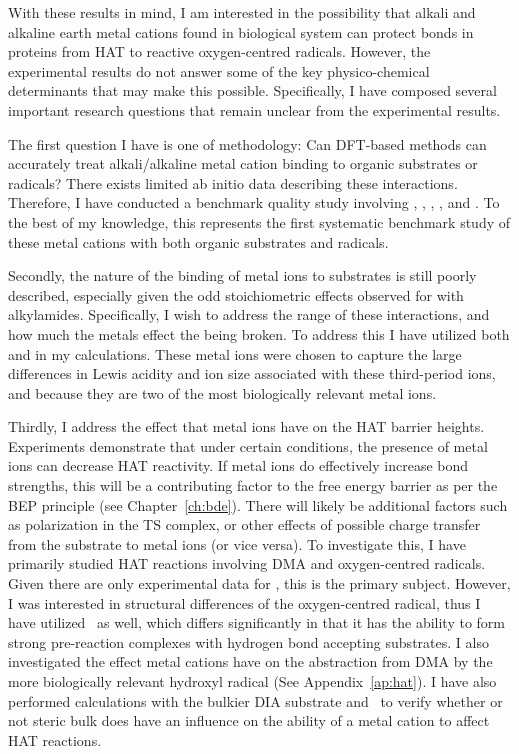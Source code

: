 \begin{doublespace}
With these results in mind, I am interested in the possibility that alkali and
alkaline earth metal cations found in biological system can protect 
bonds in proteins from HAT to reactive oxygen-centred radicals. However, the
experimental results do not answer some of the key physico-chemical determinants
that may make this possible. Specifically, I have composed several important
research questions that remain unclear from the experimental results.

The first question I have is one of methodology: Can DFT-based methods can
accurately treat alkali/alkaline metal cation binding to organic substrates or
radicals? There exists limited ab initio data describing these
interactions.\cite{ Siu2001, Corral2003, Suarez2011, Baldauf2013} Therefore, I
have conducted a benchmark quality study involving , ,
, , and . To the best of my knowledge, this
represents the first systematic benchmark study of these metal cations with both
organic substrates and radicals.

Secondly, the nature of the binding of metal ions to substrates is still poorly
described, especially given the odd stoichiometric effects observed for
 with alkylamides. Specifically, I wish to address the range of
these interactions, and how much the metals effect the  being broken. To
address this I have utilized both  and  in my calculations.
These metal ions were chosen to capture the large differences in Lewis acidity
and ion size associated with these third-period ions, and because they are two
of the most biologically relevant metal ions.

Thirdly, I address the effect that metal ions have on the HAT barrier heights.
Experiments demonstrate that under certain conditions, the presence of metal
ions can decrease HAT reactivity. If metal ions do effectively increase 
bond strengths, this will be a contributing factor to the free energy barrier as
per the BEP principle\cite{Bell1936,Evans1938} (see Chapter~\ref{ch:bde}). There
will likely be additional factors such as polarization in the TS complex, or
other effects of possible charge transfer from the substrate to metal ions (or
vice versa). To investigate this, I have primarily studied HAT reactions
involving DMA and oxygen-centred radicals. Given there are only experimental
data for \cumo, this is the primary subject. However, I was interested in
structural differences of the oxygen-centred radical, thus I have utilized \bno\
as well, which differs significantly in that it has the ability to form strong
pre-reaction complexes with hydrogen bond accepting
substrates.\cite{Salamone2012, Salamone2013} I also investigated the effect
metal cations have on the abstraction from DMA by the more biologically relevant
hydroxyl radical (See Appendix~\ref{ap:hat}). I have also performed calculations
with the bulkier DIA substrate and \cumo\ to verify whether or not steric bulk
does have an influence on the ability of a metal cation to affect HAT reactions.


\end{doublespace}
